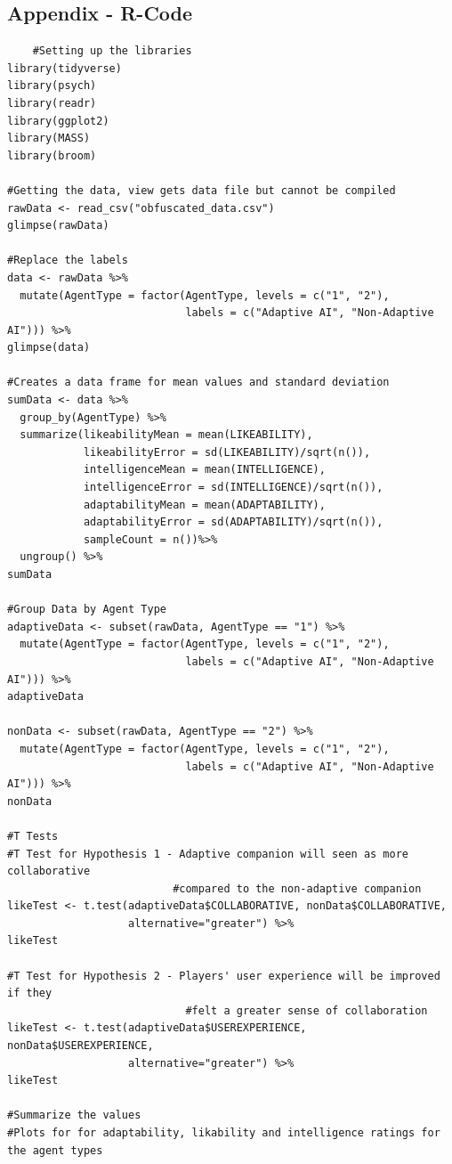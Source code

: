 \documentclass{IEEEtran}
\begin{document}
\onecolumn
\subsection{Appendix - R-Code}
\label{AppendixRCode}

\begin{verbatim}
    #Setting up the libraries
library(tidyverse)
library(psych)
library(readr)
library(ggplot2)
library(MASS)
library(broom)

#Getting the data, view gets data file but cannot be compiled
rawData <- read_csv("obfuscated_data.csv")
glimpse(rawData)

#Replace the labels
data <- rawData %>%
  mutate(AgentType = factor(AgentType, levels = c("1", "2"),
                            labels = c("Adaptive AI", "Non-Adaptive AI"))) %>%
glimpse(data)

#Creates a data frame for mean values and standard deviation
sumData <- data %>%
  group_by(AgentType) %>%
  summarize(likeabilityMean = mean(LIKEABILITY),
            likeabilityError = sd(LIKEABILITY)/sqrt(n()),
            intelligenceMean = mean(INTELLIGENCE),
            intelligenceError = sd(INTELLIGENCE)/sqrt(n()),
            adaptabilityMean = mean(ADAPTABILITY),
            adaptabilityError = sd(ADAPTABILITY)/sqrt(n()),
            sampleCount = n())%>%
  ungroup() %>%
sumData

#Group Data by Agent Type
adaptiveData <- subset(rawData, AgentType == "1") %>%
  mutate(AgentType = factor(AgentType, levels = c("1", "2"), 
                            labels = c("Adaptive AI", "Non-Adaptive AI"))) %>%
adaptiveData

nonData <- subset(rawData, AgentType == "2") %>%
  mutate(AgentType = factor(AgentType, levels = c("1", "2"), 
                            labels = c("Adaptive AI", "Non-Adaptive AI"))) %>%
nonData

#T Tests
#T Test for Hypothesis 1 - Adaptive companion will seen as more collaborative 
                          #compared to the non-adaptive companion
likeTest <- t.test(adaptiveData$COLLABORATIVE, nonData$COLLABORATIVE, 
                   alternative="greater") %>%
likeTest

#T Test for Hypothesis 2 - Players' user experience will be improved if they 
                            #felt a greater sense of collaboration
likeTest <- t.test(adaptiveData$USEREXPERIENCE, nonData$USEREXPERIENCE, 
                   alternative="greater") %>%
likeTest

#Summarize the values
#Plots for for adaptability, likability and intelligence ratings for the agent types


\end{verbatim}
\end{document}
